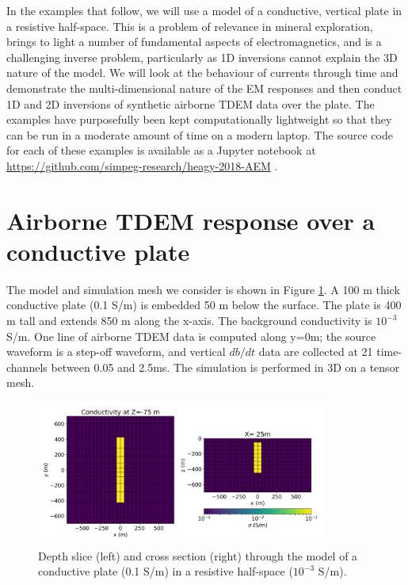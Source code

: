 \documentclass[paper]{geophysics}
\begin{document}
In the examples that follow, we will use a model of a conductive, vertical plate in a resistive half-space. This is a problem of relevance in mineral exploration, brings to light a number of fundamental aspects of electromagnetics, and is a challenging inverse problem, particularly as 1D inversions cannot explain the 3D nature of the model. We will look at the behaviour of currents through time and demonstrate the multi-dimensional nature of the EM responses and then conduct 1D and 2D inversions of synthetic airborne TDEM data over the plate. The examples have purposefully been kept computationally lightweight so that they can be run in a moderate amount of time on a modern laptop. The source code for each of these examples is available as a Jupyter notebook at
\href{https://github.com/simpeg-research/heagy-2018-AEM}{https://github.com/simpeg-research/heagy-2018-AEM} \citep{Heagy2018}.

\section{Airborne TDEM response over a conductive plate}
The model and simulation mesh we consider is shown in Figure \ref{fig:model}. A 100 m thick conductive plate (0.1 S/m) is embedded 50 m below the surface. The plate is 400 m tall and extends 850 m along the x-axis. The background conductivity is $10^{-3}$ S/m. One line of airborne TDEM data is computed along y=0m; the source waveform is a step-off waveform, and vertical $db/dt$ data are collected at 21 time-channels between 0.05 and 2.5ms. The simulation is performed in 3D on a tensor mesh.

\begin{figure}[!htb]
  \centering
  \includegraphics[width=0.85\textwidth]{figures/model.png}
  \caption{Depth slice (left) and cross section (right) through the model of a conductive plate (0.1 S/m) in a resistive half-space ($10^{-3}$ S/m).}
  \label{fig:model}
\end{figure}
\end{document}
